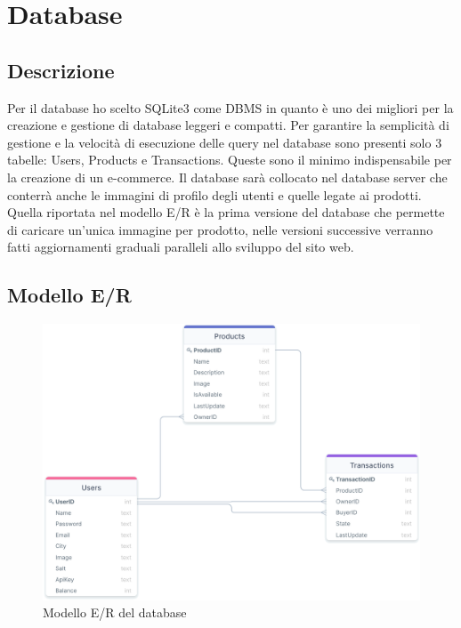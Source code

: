 \section{Database}
\subsection{Descrizione}
Per il database ho scelto SQLite3 come DBMS in quanto è uno dei migliori per la creazione e gestione di database leggeri e compatti. Per garantire la semplicità di gestione e la velocità di esecuzione delle query nel database sono presenti solo 3 tabelle: Users, Products e Transactions. Queste sono il minimo indispensabile per la creazione di un e-commerce. Il database sarà collocato nel database server che conterrà anche le immagini di profilo degli utenti e quelle legate ai prodotti. Quella riportata nel modello E/R è la prima versione del database che permette di caricare un'unica immagine per prodotto, nelle versioni successive verranno fatti aggiornamenti graduali paralleli allo sviluppo del sito web. 
\subsection{Modello E/R}
\begin{figure}[ht]
    \centering\includegraphics[scale=0.29]{images/modello_e_r.png}
    \caption{Modello E/R del database}
\end{figure}
